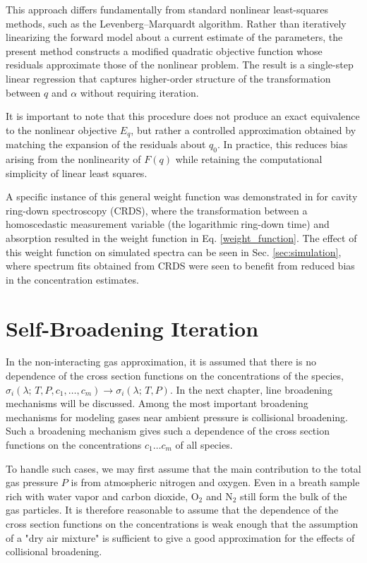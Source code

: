 \documentclass[12pt]{report}
\begin{document}
	
	This approach differs fundamentally from standard nonlinear least-squares methods, such as the Levenberg--Marquardt algorithm. Rather than iteratively linearizing the forward model about a current estimate of the parameters, the present method constructs a modified quadratic objective function whose residuals approximate those of the nonlinear problem. The result is a single-step linear regression that captures higher-order structure of the transformation between $q$ and $\alpha$ without requiring iteration.
	
	It is important to note that this procedure does not produce an exact equivalence to the nonlinear objective $E_q$, but rather a controlled approximation obtained by matching the expansion of the residuals about $q_0$. In practice, this reduces bias arising from the nonlinearity of $F(q)$ while retaining the computational simplicity of linear least squares.
	
	A specific instance of this general weight function was demonstrated in \cite{mine_acetone} for cavity ring-down spectroscopy (CRDS), where the transformation between a homoscedastic measurement variable (the logarithmic ring-down time) and absorption resulted in the weight function in Eq. \ref{weight_function}. The effect of this weight function on simulated spectra can be seen in Sec. \ref{sec:simulation}, where spectrum fits obtained from CRDS were seen to benefit from reduced bias in the concentration estimates.
	
	\section{Self-Broadening Iteration} \label{sec:self_broading_iteration}
	In the non-interacting gas approximation, it is assumed that there is no dependence of the cross section functions on the concentrations of the species, $\sigma_i(\lambda ;\,T, P, c_1, \ldots, c_m) \rightarrow \sigma_i(\lambda ;\,T, P)$. In the next chapter, line broadening mechanisms will be discussed. Among the most important broadening mechanisms for modeling gases near ambient pressure is collisional broadening. Such a broadening mechanism gives such a dependence of the cross section functions on the concentrations $c_1 \ldots c_m$ of all species.
	
	To handle such cases, we may first assume that the main contribution to the total gas pressure $P$ is from atmospheric nitrogen and oxygen. Even in a breath sample rich with water vapor and carbon dioxide, O$_2$ and N$_2$ still form the bulk of the gas particles. It is therefore reasonable to assume that the dependence of the cross section functions on the concentrations is weak enough that the assumption of a "dry air mixture" is sufficient to give a good approximation for the effects of collisional broadening.
	
\end{document}
